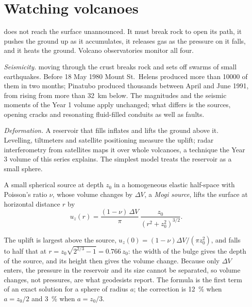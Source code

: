 \section{Watching volcanoes}

 does not reach the surface unannounced. It must break rock to open its
path, it pushes the ground up as it accumulates, it releases gas as the pressure
on it falls, and it heats the ground. Volcano observatories monitor all four.

\emph{Seismicity.}  moving through the crust breaks rock and sets off swarms
of small earthquakes. Before 18 May 1980 Mount St.~Helens produced more than
\num{10000} of them in two months; Pinatubo produced thousands between April and
June 1991, from  rising from more than \qty{32}{km} below. The magnitudes
and the seismic moments of the Year 1 volume apply unchanged; what differs is the
sources, opening cracks and resonating fluid-filled conduits as well as faults.

\emph{Deformation.} A reservoir that fills inflates and lifts the ground above
it. Levelling, tiltmeters and satellite positioning measure the uplift; radar interferometry from satellites maps it over whole
volcanoes, a technique the Year 3 volume of this series explains. The simplest
model treats the reservoir as a small sphere.

\begin{proposition}\label{prop:b2:eruptive-styles:mogi}
A small spherical source at depth $z_0$ in a homogeneous elastic half-space
with Poisson's ratio $\nu$, whose volume changes by $\Delta V$, a
\emph{Mogi source}, lifts the surface at horizontal distance $r$
by
\[
u_z(r) = \frac{(1 - \nu)\,\Delta V}{\pi}\,\frac{z_0}{(r^2 + z_0^2)^{3/2}} .
\]
\end{proposition}
\admitted

The uplift is largest above the source, $u_z(0) = (1 - \nu)\Delta V/(\pi z_0^2)$, and
falls to half that at $r = z_0\sqrt{2^{2/3} - 1} = 0.766\,z_0$: the width of the
bulge gives the depth of the source, and its height then gives the volume
change. Because only $\Delta V$ enters, the pressure in the reservoir and its size
cannot be separated, so volume changes, not pressures, are what geodesists
report. The formula is the first term of an exact solution for a sphere of radius
$a$; the correction is \qty{12}{\percent} when $a = z_0/2$ and \qty{3}{\percent}
when $a = z_0/3$.

